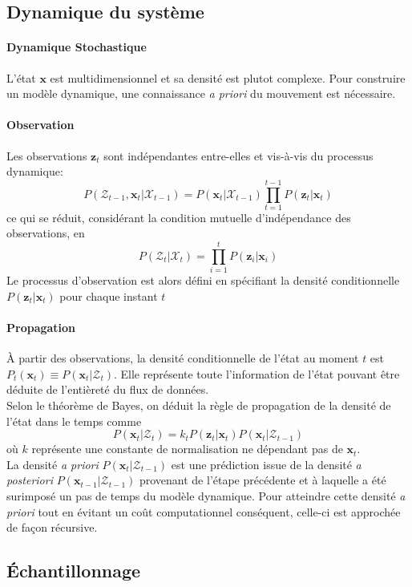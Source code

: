 \documentclass[a4paper,12pt]{report}
\begin{document}
\subsection{Dynamique du système}
\paragraph{Dynamique Stochastique}
L'état $\mathbf{x}$ est multidimensionnel et sa densité est plutot complexe.
Pour construire un  modèle dynamique, une connaissance \textit{a priori} du mouvement est nécessaire.
\paragraph{Observation}
Les observations $\mathbf{z}_t$ sont indépendantes entre-elles et vis-à-vis du processus dynamique:
$$P(\mathcal{Z}_{t-1},\mathbf{x}_t|\mathcal{X}_{t-1}) = P(\mathbf{x}_t|\mathcal{X}_{t-1})\prod_{t=1}^{t-1} P(\mathbf{z}_t|\mathbf{x}_t)$$
ce qui se réduit, considérant la condition mutuelle d'indépendance des observations, en
$$P(\mathcal{Z}_{t}|\mathcal{X}_{t}) = \prod_{i=1}^{t} P(\mathbf{z}_i|\mathbf{x}_i)$$
Le processus d'observation est alors défini en spécifiant la densité conditionnelle $P(\mathbf{z}_t|\mathbf{x}_t)$ pour chaque instant $t$
\paragraph{Propagation}
\`{A} partir des observations, la densité conditionnelle de l'état au moment $t$ est $P_t(\mathbf{x}_t) \equiv P(\mathbf{x}_t|\mathcal{Z}_t)$. Elle représente toute l'information de l'état pouvant être déduite de l'entièreté du flux de données.\\
Selon le théorème de Bayes, on déduit la règle de propagation de la densité de l'état dans le temps comme  
$$P(\mathbf{x}_{t}|\mathcal{Z}_{t}) = k_t P(\mathbf{z}_t|\mathbf{x}_t)P(\mathbf{x}_t|\mathcal{Z}_{t-1})$$
où $k$ représente une constante de normalisation ne dépendant pas de $\mathbf{x}_t$.\\
La densité \textit{a priori} $P(\mathbf{x}_t|\mathcal{Z}_{t-1})$ est une prédiction issue de la densité \textit{a posteriori} $P(\mathbf{x}_{t-1}|\mathcal{Z}_{t-1})$ provenant de l'étape précédente et à laquelle a été surimposé un pas de temps du modèle dynamique.
Pour atteindre cette densité \textit{a priori} tout en évitant un coût computationnel conséquent, celle-ci est approchée de façon récursive.

\subsection{\'{E}chantillonnage}
\end{document}
